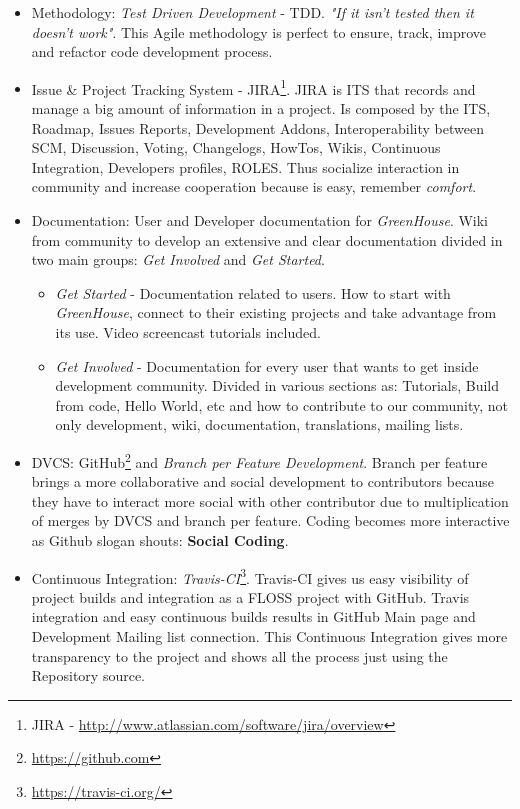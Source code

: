 \documentclass[11pt]{scrartcl}
\begin{document}
\begin{itemize}
	\item Methodology: \emph{Test Driven Development} - TDD. \emph{"If it isn’t tested then it doesn’t work"}. This Agile methodology is perfect to ensure, track, improve and refactor code development process.
	\item Issue \& Project Tracking System - JIRA\footnote{JIRA - \url{http://www.atlassian.com/software/jira/overview}}. JIRA is ITS that records and manage a big amount of information in a project. Is composed by the ITS, Roadmap, Issues Reports, Development Addons, Interoperability between SCM, Discussion, Voting, Changelogs, HowTos, Wikis, Continuous Integration, Developers profiles, ROLES. Thus socialize interaction in community and increase cooperation because is easy, remember \emph{comfort}.
	\item Documentation: User and Developer documentation for \emph{GreenHouse}. Wiki from community to develop an extensive and clear documentation divided in two main groups: \emph{Get Involved} and \emph{Get Started}.
	\begin{itemize}
	    \item \emph{Get Started} - Documentation related to users. How to start with \emph{GreenHouse}, connect to their existing projects and take advantage from its use. Video screencast tutorials included.
	    \item \emph{Get Involved} - Documentation for every user that wants to get inside development community. Divided in various sections as: Tutorials, Build from code, Hello World, etc and how to contribute to our community, not only development, wiki, documentation, translations, mailing lists.
    \end{itemize}
	\item DVCS: GitHub\footnote{\url{https://github.com}} and \emph{Branch per Feature Development}\cite{branch-per-feature}. Branch per feature brings a more collaborative and social development to contributors because they have to interact more social with other contributor due to multiplication of merges by DVCS and branch per feature. Coding becomes more interactive as Github slogan shouts: \textbf{Social Coding}.
	\item Continuous Integration: \emph{Travis-CI}\footnote{\url{https://travis-ci.org/}}. Travis-CI gives us easy visibility of project builds and integration as a FLOSS project with GitHub. Travis integration and easy continuous builds results in GitHub Main page and Development Mailing list connection. This Continuous Integration gives more transparency to the project and shows all the process just using the Repository source.

\end{itemize}
\end{document}

